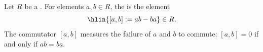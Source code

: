\begin{definition} \label{definition:commutator_of_two_elements_of_a_ring}
    Let $R$ be a . For elements $a,b \in R$, the  is the element
    $$\hlin{[a,b] := ab - ba} \in R.$$
    The commutator $[a,b]$ measures the failure of $a$ and $b$ to commute: $[a,b] = 0$ if and only if $ab = ba$.
\end{definition}
